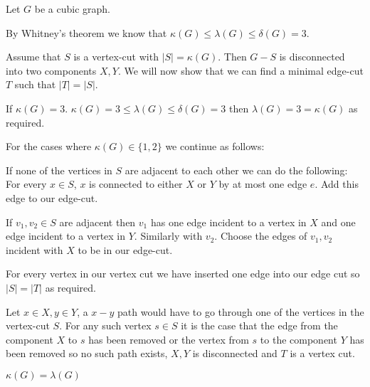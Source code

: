 Let $G$ be a cubic graph. 

By Whitney's theorem we know that $\kappa(G) \le \lambda(G) \le \delta(G) = 3 $.

Assume that $S$ is a vertex-cut with $|S| = \kappa(G)$. Then
$G-S$ is disconnected into two components $X, Y$. 
We will now show that we can find a minimal edge-cut $T$ such that $|T| = |S|$.

If $\kappa(G) = 3$. $\kappa(G) = 3 \le \lambda(G) \le \delta(G) = 3$
then $\lambda(G) = 3 = \kappa(G)$ as required.

For the cases where $\kappa(G) \in \{1, 2\}$ we continue as follows:

If none of the vertices in $S$ are adjacent to each other we can do the following:
For every $x \in S$, $x$ is connected to either $X$ or $Y$ by at most one edge $e$. 
Add this edge to our edge-cut.

If $v_1, v_2 \in S$ are adjacent then $v_1$ has one edge incident to a vertex 
in $X$ and one edge incident to a vertex in $Y$. Similarly with $v_2$. Choose 
the edges of $v_1, v_2$ incident with $X$ to be in our edge-cut. 

For every vertex in our vertex cut we have inserted one edge into our edge
cut so $|S| = |T|$ as required. 

Let $x\in X, y \in Y$, a $x-y$ path would have to go through one of the
vertices in the vertex-cut $S$. For any such vertex $s \in S$ it is the
case that the edge from the component $X$ to $s$ has been removed or the
vertex from $s$ to the component $Y$ has been removed so no such path
exists, $X, Y$ is disconnected and $T$ is a vertex cut. 

$\kappa(G) = \lambda(G)$
